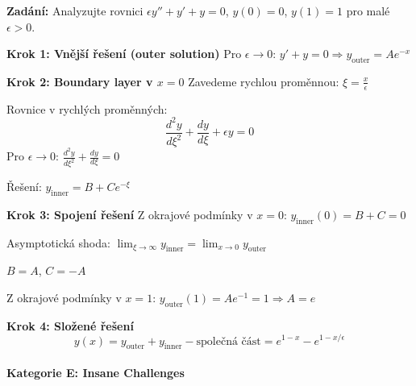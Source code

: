 \begin{example}
\label{ex:singularni-perturbace}

\noindent\textbf{Zadání:} Analyzujte rovnici $\epsilon y'' + y' + y = 0$, $y(0) = 0$, $y(1) = 1$ pro malé $\epsilon > 0$.

\vspace{1.5\baselineskip}

\noindent\textbf{Krok 1: Vnější řešení (outer solution)}
Pro $\epsilon \to 0$: $y' + y = 0 \Rightarrow y_{\text{outer}} = Ae^{-x}$

\vspace{1\baselineskip}

\noindent\textbf{Krok 2: Boundary layer v $x = 0$}
Zavedeme rychlou proměnnou: $\xi = \frac{x}{\epsilon}$

Rovnice v rychlých proměnných:
\[
\frac{d^2y}{d\xi^2} + \frac{dy}{d\xi} + \epsilon y = 0
\]
Pro $\epsilon \to 0$: $\frac{d^2y}{d\xi^2} + \frac{dy}{d\xi} = 0$

Řešení: $y_{\text{inner}} = B + Ce^{-\xi}$

\vspace{1\baselineskip}

\noindent\textbf{Krok 3: Spojení řešení}
Z okrajové podmínky v $x = 0$: $y_{\text{inner}}(0) = B + C = 0$

Asymptotická shoda: $\lim_{\xi \to \infty} y_{\text{inner}} = \lim_{x \to 0} y_{\text{outer}}$

$B = A$, $C = -A$

Z okrajové podmínky v $x = 1$: $y_{\text{outer}}(1) = Ae^{-1} = 1 \Rightarrow A = e$

\vspace{1\baselineskip}

\noindent\textbf{Krok 4: Složené řešení}
\[
y(x) = y_{\text{outer}} + y_{\text{inner}} - \text{společná část} = e^{1-x} - e^{1-x/\epsilon}
\]

\end{example}

\paragraph{Kategorie E: Insane Challenges}


